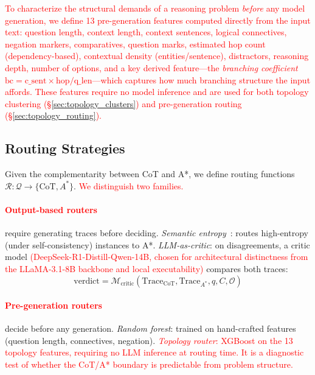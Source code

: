 \documentclass[11pt]{article}
\begin{document}
\textcolor{red}{To characterize the structural demands of a reasoning problem \emph{before} any model generation, we define 13 pre-generation features computed directly from the input text: question length, context length, context sentences, logical connectives, negation markers, comparatives, question marks, estimated hop count (dependency-based), contextual density (entities/sentence), distractors, reasoning depth, number of options, and a key derived feature---the \emph{branching coefficient} $\text{bc} = \text{c\_sent} \times \text{hop} / \text{q\_len}$---which captures how much branching structure the input affords. These features require no model inference and are used for both topology clustering (\S\ref{sec:topology_clusters}) and pre-generation routing (\S\ref{sec:topology_routing}).}

\subsection{Routing Strategies}
\label{sec:routing}

Given the complementarity between CoT and A*, we define routing functions $\mathcal{R}: \mathcal{Q} \to \{\text{CoT}, A^*\}$. \textcolor{red}{We distinguish two families.}

\textcolor{red}{\paragraph{Output-based routers}} require generating traces before deciding. \emph{Semantic entropy}~\citep{kossen2024semanticentropyprobesrobust}: routes high-entropy (under self-consistency) instances to A*. \emph{LLM-as-critic}: on disagreements, a critic model \textcolor{red}{(DeepSeek-R1-Distill-Qwen-14B, chosen for architectural distinctness from the LLaMA-3.1-8B backbone and local executability)} compares both traces:
\begin{equation}
\text{verdict} = \mathcal{M}_{\text{critic}}(\text{Trace}_{\text{CoT}}, \text{Trace}_{A^*}, q, C, \mathcal{O})
\label{eq:critic}
\end{equation}

\textcolor{red}{\paragraph{Pre-generation routers}} decide before any generation. \emph{Random forest}: trained on hand-crafted features (question length, connectives, negation). \textcolor{red}{\emph{Topology router}: XGBoost on the 13 topology features, requiring no LLM inference at routing time. It is a diagnostic test of whether the CoT/A* boundary is predictable from problem structure.}
\end{document}
